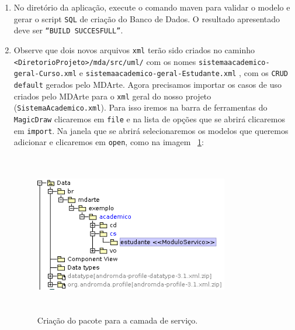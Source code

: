 \begin{enumerate}
\item No diretório da aplicação, execute o comando maven para validar o modelo e
gerar o script \texttt{SQL} de criação do Banco de Dados. O resultado
apresentado deve ser \texttt{“BUILD SUCCESFULL”}.
	
\item Observe que dois novos arquivos \texttt{xml} terão sido criados no caminho
\texttt{<DiretorioProjeto>/mda/src/uml/} com os nomes
\texttt{sistemaacademico-geral-Curso.xml} e
\texttt{sistemaacademico-geral-Estudante.xml} , com os
\texttt{CRUD} \texttt{default} gerados pelo MDArte. Agora precisamos importar os
casos de uso criados pelo MDArte para o \texttt{xml} geral do nosso projeto
(\texttt{SistemaAcademico.xml}). Para isso iremos na barra de ferramentas do
\texttt{MagicDraw} clicaremos em \texttt{file} e na lista de opções que se
abrirá clicaremos em \texttt{import}. Na janela que se abrirá selecionaremos os
modelos que queremos adicionar e clicaremos em \texttt{open}, como na imagem
~\ref{importa_modulo_geral}:
 \begin{figure}[H]
	\centering
	\includegraphics[width=240pt,height=200pt]{imgs/tutorial-mdarte-0008.png}
	\caption{Criação do pacote para a camada de serviço.}
	\label{importa_modulo_geral}
\end{figure} 


\end{enumerate}
